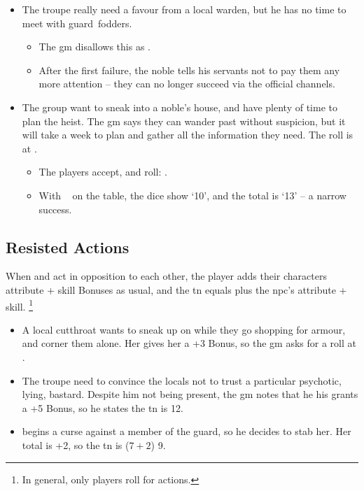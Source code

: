 \begin{multicols}{2}
\begin{exampletext}
\begin{itemize}
  \item
    The troupe really need a favour from a local \gls{warden}, but he has no time to meet with \gls{guard}~\glspl{fodder}.
  \begin{itemize}
    \item
    The \gls{gm} disallows this as .
    \item
    After the first failure, the noble tells his servants not to pay them any more attention -- they can no longer succeed via the official channels.
  \end{itemize}
  \item
  The group want to sneak into a noble's house, and have plenty of time to plan the heist.
  The \gls{gm} says they can wander past without suspicion, but it will take a week to plan and gather all the information they need.
  The roll is  at \tn[12].
    \begin{itemize}
    \item
    The players accept, and roll: .
    \item
    With ~ on the table, the dice show `10', and the total is `13' -- a narrow success.
    \end{itemize}
\end{itemize}
\end{exampletext}

\subsection{Resisted Actions}
\label{resistedactions}

When  and  act in opposition to each other, the player adds their characters \gls{attribute} + \gls{skill} Bonuses as usual, and the \gls{tn} equals \tn[7] plus the \gls{npc}'s \gls{attribute} + \gls{skill}.%
\footnote{In general, only players roll for actions.}

\begin{exampletext}
  \begin{itemize}
    \item
      A local cutthroat wants to sneak up on  while they go shopping for armour, and corner them alone.
      Her  gives her a +3 Bonus, so the \gls{gm} asks for a  roll at \tn[10].
    \item
      The troupe need to convince the locals not to trust a particular psychotic, lying, bastard.
      Despite him not being present, the \gls{gm} notes that he his  grants a +5 Bonus, so he states the \gls{tn} is 12.
    \item
     begins a curse against a member of the \gls{guard}, so he decides to stab her.
    Her  total is +2, so the \gls{tn} is ($7+2$) 9.


\end{itemize}
\end{exampletext}
\end{multicols}
